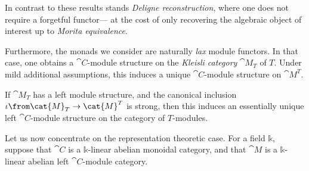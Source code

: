 \documentclass[portrait, noFonts]{betterposter/betterposter}
\renewcommand{\k}{\mathbb{k}}
\begin{document}
{  In contrast to these results stands \emph{Deligne reconstruction},
  where one does not require a forgetful functor—%
  at the cost of only recovering the algebraic object of interest up to \emph{Morita equivalence}.
}{                                                             %
  \bigskip
  Furthermore, the monads we consider are naturally \emph{lax} module functors.
  In that case, one obtains a \(\cat{C}\)-module structure on the \emph{Kleisli category} \(\cat{M}_T\) of \(T\).
  Under mild additional assumptions,
  this induces a unique \(\cat{C}\)-module structure on \(\cat{M}^T\).\\[-0.6em]
  \begin{highlight}
    If \(\cat{M}_T\) has a left module structure,
    and the canonical inclusion \(\iota\from \cat{M}_T \to \cat{M}^T\) is strong,
    then this induces an essentially unique left \(\cat{C}\)-module structure on
    the category of \(T\)-modules.
  \end{highlight}
  Let us now concentrate on the representation theoretic case.
  For a field \(\k\), suppose that \(\cat{C}\) is a \(\k\)-linear abelian monoidal category,
  and that \(\cat{M}\) is a \(\k\)-linear abelian left \(\cat{C}\)-module category.
}

\end{document}
